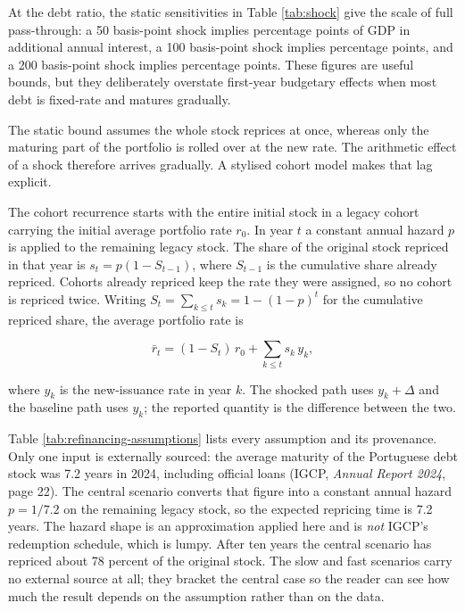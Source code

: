 \documentclass[11pt,a4paper]{article}
\begin{document}
At the \LatestYear{} debt ratio, the static sensitivities in Table
\ref{tab:shock} give the scale of full pass-through: a 50 basis-point shock
implies \ShockFiftyAdditionalPp{} percentage points of GDP in additional annual
interest, a 100 basis-point shock implies \ShockHundredAdditionalPp{} percentage
points, and a 200 basis-point shock implies \ShockTwoHundredAdditionalPp{}
percentage points. These figures are useful bounds, but they deliberately
overstate first-year budgetary effects when most debt is fixed-rate and matures
gradually.



The static bound assumes the whole stock reprices at once, whereas only the
maturing part of the portfolio is rolled over at the new rate. The arithmetic
effect of a shock therefore arrives gradually. A stylised cohort model makes
that lag explicit.

\label{sec:refinancing}
The cohort recurrence starts with the entire initial stock in a legacy cohort
carrying the initial average portfolio rate
$r_0$. In year $t$ a constant annual hazard $p$ is applied to the remaining
legacy stock. The share of the original stock repriced in that year is
$s_t=p(1-S_{t-1})$, where $S_{t-1}$ is the cumulative share already repriced.
Cohorts already repriced keep the rate they were assigned, so no cohort is
repriced twice. Writing $S_t = \sum_{k \le t} s_k = 1-(1-p)^t$ for the
cumulative repriced share, the average portfolio rate is

\begin{equation}
  \bar{r}_t = (1 - S_t)\, r_0 + \sum_{k \le t} s_k \, y_k ,
  \label{eq:cohort}
\end{equation}

where $y_k$ is the new-issuance rate in year $k$. The shocked path uses
$y_k + \Delta$ and the baseline path uses $y_k$; the reported quantity is the
difference between the two.



Table \ref{tab:refinancing-assumptions} lists every assumption and its
provenance. Only one input is externally sourced: the average maturity of the
Portuguese debt stock was 7.2 years in 2024, including official loans (IGCP,
\emph{Annual Report 2024}, page 22). The central scenario converts that figure
into a constant annual hazard
$p=1/7.2$ on the remaining legacy stock, so the expected repricing time is 7.2
years. The hazard shape is an approximation applied here and is \emph{not}
IGCP's redemption schedule, which is lumpy. After ten years the central
scenario has repriced about 78 percent of the original stock. The slow and fast
scenarios carry no external source at all; they bracket the central case so the
reader can see how much the result depends on the assumption rather than on the
data.
\end{document}
